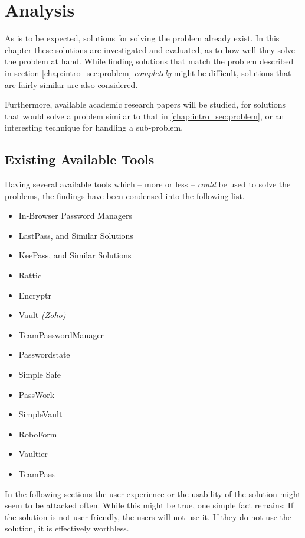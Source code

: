 \chapter{Analysis}
\label{chap:analysis}
	As is to be expected, solutions for solving the problem already exist. In this chapter these solutions are investigated and evaluated, as to how well they solve the problem at hand. While finding solutions that match the problem described in section \ref{chap:intro_sec:problem} \emph{completely} might be difficult, solutions that are fairly similar are also considered.

	Furthermore, available academic research papers will be studied, for solutions that would solve a problem similar to that in \ref{chap:intro_sec:problem}, or an interesting technique for handling a sub-problem.

	\section{Existing Available Tools}
		\label{sec:solutions:commercial}
		Having several available tools which -- more or less -- \emph{could} be used to solve the problems, the findings have been condensed into the following list.
		\begin{itemize}
			\item In-Browser Password Managers
			\item LastPass, and Similar Solutions
			\item KeePass, and Similar Solutions
			\item Rattic
			\item Encryptr
			\item Vault \emph{(Zoho)}
			\item TeamPasswordManager
			\item Passwordstate
			\item Simple Safe
			\item PassWork
			\item SimpleVault
			\item RoboForm
			\item Vaultier
			\item TeamPass 
		\end{itemize}
		In the following sections the user experience or the usability of the solution might seem to be attacked often. While this might be true, one simple fact remains: If the solution is not user friendly, the users will not use it. If they do not use the solution, it is effectively worthless.

